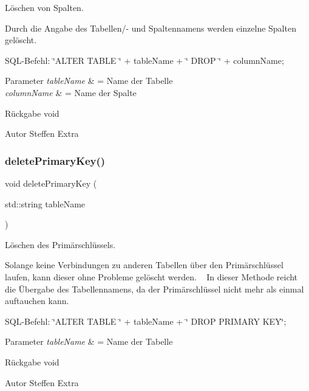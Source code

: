 Löschen von Spalten. 

Durch die Angabe des Tabellen/-\/ und Spaltennamens werden einzelne Spalten gelöscht.

S\+Q\+L-\/\+Befehl\+: \char`\"{}\+A\+L\+T\+E\+R T\+A\+B\+L\+E \char`\"{} + table\+Name + \char`\"{} D\+R\+O\+P \char`\"{} + column\+Name;


\begin{DoxyParams}{Parameter}
{\em table\+Name} & = Name der Tabelle \\
\hline
{\em column\+Name} & = Name der Spalte\\
\hline
\end{DoxyParams}
\begin{DoxyReturn}{Rückgabe}
void
\end{DoxyReturn}
\begin{DoxyAuthor}{Autor}
Steffen Extra 
\end{DoxyAuthor}
\mbox{\label{tables_8hpp_a36d0f9bb1b86a8155d7551fcd014b4da}} 
\subsubsection{delete\+Primary\+Key()}
{\footnotesize\ttfamily void delete\+Primary\+Key (\begin{DoxyParamCaption}\item[{std\+::string}]{table\+Name }\end{DoxyParamCaption})}



Löschen des Primärschlüssels. 

Solange keine Verbindungen zu anderen Tabellen über den Primärschlüssel laufen, kann dieser ohne Probleme gelöscht werden. ~\newline
 In dieser Methode reicht die Übergabe des Tabellennamens, da der Primärschlüssel nicht mehr als einmal auftauchen kann. ~\newline


S\+Q\+L-\/\+Befehl\+: \char`\"{}\+A\+L\+T\+E\+R T\+A\+B\+L\+E \char`\"{} + table\+Name + \char`\"{} D\+R\+O\+P P\+R\+I\+M\+A\+R\+Y K\+E\+Y\char`\"{};


\begin{DoxyParams}{Parameter}
{\em table\+Name} & = Name der Tabelle\\
\hline
\end{DoxyParams}
\begin{DoxyReturn}{Rückgabe}
void
\end{DoxyReturn}
\begin{DoxyAuthor}{Autor}
Steffen Extra 
\end{DoxyAuthor}
\mbox{\label{tables_8hpp_aee892818f06208ce4b68fb7598a7494c}} 
